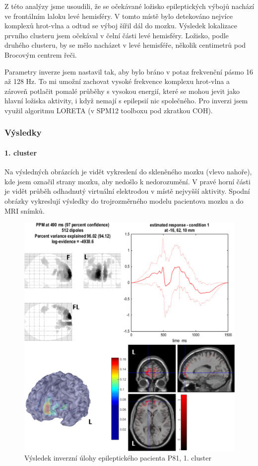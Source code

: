 Z této analýzy jsme usoudili, že se očekávané ložisko epileptických výbojů nachází ve frontálním laloku levé hemisféry. V tomto místě bylo detekováno nejvíce komplexů hrot-vlna a odtud se výboj šířil dál do mozku. Výsledek lokalizace prvního clusteru jsem očekával v čelní části levé hemisféry. Ložisko, podle druhého clusteru, by se mělo nacházet v levé hemisféře, několik centimetrů pod Brocovým centrem řeči.
 
Parametry inverze jsem nastavil tak, aby bylo bráno v potaz frekvenční pásmo 16 až 128 Hz. To mi umožní zachovat vysoké frekvence komplexu hrot-vlna a zároveň potlačit pomalé průběhy s vysokou energií, které se mohou jevit jako hlavní ložiska aktivity, i když nemají s epilepsií nic společného. Pro inverzi jsem využil algoritmu LORETA (v SPM12 toolboxu pod zkratkou COH).

\newpage
\subsubsection{Výsledky}

\paragraph{1. cluster}
Na výsledných obrázcích je vidět vykreslení do skleněného mozku (vlevo nahoře), kde jsem označil strany mozku, aby nedošlo k nedorozumění. V pravé horní části je vidět průběh odhadnutý virtuální elektrodou v místě nejvyšší aktivity. Spodní obrázky vykreslují výsledky do trojrozměrného modelu pacientova mozku a do MRI snímků.

\begin{figure}[!h]
\includegraphics[width=1.0\textwidth]{casti/aplikace/epilepsie/1cl.png}
\caption{Výsledek inverzní úlohy epileptického pacienta P81, 1. cluster}
\end{figure}


